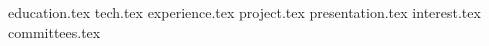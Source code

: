 \documentclass[11pt, a4paper]{awesome-cv}
\newcommand*{\sectiondir}{resume/}
\begin{document}
\makecvheader

{education.tex}
{tech.tex}
{experience.tex}
{project.tex}
{presentation.tex}
{interest.tex}
{committees.tex}
\end{document}
